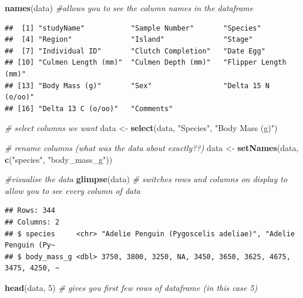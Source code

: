 \documentclass[
]{article}
\newenvironment{Shaded}{\begin{snugshade}}{\end{snugshade}}
\newcommand{\CommentTok}[1]{\textcolor[rgb]{0.56,0.35,0.01}{\textit{#1}}}
\newcommand{\DecValTok}[1]{\textcolor[rgb]{0.00,0.00,0.81}{#1}}
\newcommand{\FunctionTok}[1]{\textcolor[rgb]{0.13,0.29,0.53}{\textbf{#1}}}
\newcommand{\NormalTok}[1]{#1}
\newcommand{\OtherTok}[1]{\textcolor[rgb]{0.56,0.35,0.01}{#1}}
\newcommand{\StringTok}[1]{\textcolor[rgb]{0.31,0.60,0.02}{#1}}
\begin{document}
\begin{Shaded}
\begin{Highlighting}[]
\FunctionTok{names}\NormalTok{(data) }\CommentTok{\#allows you to see the column names in the dataframe}
\end{Highlighting}
\end{Shaded}

\begin{verbatim}
##  [1] "studyName"           "Sample Number"       "Species"            
##  [4] "Region"              "Island"              "Stage"              
##  [7] "Individual ID"       "Clutch Completion"   "Date Egg"           
## [10] "Culmen Length (mm)"  "Culmen Depth (mm)"   "Flipper Length (mm)"
## [13] "Body Mass (g)"       "Sex"                 "Delta 15 N (o/oo)"  
## [16] "Delta 13 C (o/oo)"   "Comments"
\end{verbatim}

\begin{Shaded}
\begin{Highlighting}[]
\CommentTok{\# select columns we want}
\NormalTok{data }\OtherTok{\textless{}{-}} \FunctionTok{select}\NormalTok{(data, }\StringTok{"Species"}\NormalTok{, }\StringTok{"Body Mass (g)"}\NormalTok{)}

\CommentTok{\#\textquotesingle{} rename columns (what was the data about exactly??)}
\NormalTok{data }\OtherTok{\textless{}{-}} \FunctionTok{setNames}\NormalTok{(data, }\FunctionTok{c}\NormalTok{(}\StringTok{"species"}\NormalTok{, }\StringTok{"body\_mass\_g"}\NormalTok{))}

\CommentTok{\#visualise the data}
\FunctionTok{glimpse}\NormalTok{(data) }\CommentTok{\# switches rows and columns on display to allow you to see every column of data}
\end{Highlighting}
\end{Shaded}

\begin{verbatim}
## Rows: 344
## Columns: 2
## $ species     <chr> "Adelie Penguin (Pygoscelis adeliae)", "Adelie Penguin (Py~
## $ body_mass_g <dbl> 3750, 3800, 3250, NA, 3450, 3650, 3625, 4675, 3475, 4250, ~
\end{verbatim}

\begin{Shaded}
\begin{Highlighting}[]
\FunctionTok{head}\NormalTok{(data, }\DecValTok{5}\NormalTok{) }\CommentTok{\# gives you first few rows of dataframe (in this case 5)}
\end{Highlighting}
\end{Shaded}
\end{document}
